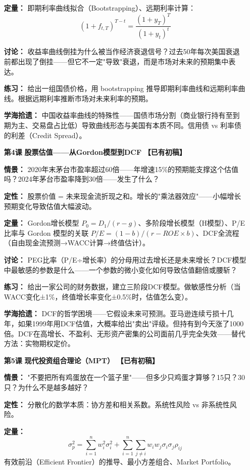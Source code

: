 \documentclass[a4paper,11pt]{ctexart}
\newcommand{\done}{\textcolor{green!50!black}{\textbf{【已有初稿】}}}
\begin{document}
\begin{enumerate}
\textbf{定量：} 即期利率曲线拟合（Bootstrapping）、远期利率计算：
\[
(1+f_{t,T})^{T-t} = \frac{(1+y_T)^T}{(1+y_t)^t}
\]

\textbf{讨论：} 收益率曲线倒挂为什么被当作经济衰退信号？过去50年每次美国衰退前都出现了倒挂——但它不一定"导致"衰退，而是市场对未来的预期集中表达。

\textbf{练习：} 给出一组国债价格，用 bootstrapping 推导即期利率曲线和远期利率曲线。根据远期利率推断市场对未来利率的预期。

\textbf{学海拾遗：} 中国收益率曲线的特殊性——国债市场分割（商业银行持有至到期为主、交易盘占比低）导致曲线形态与美国有本质不同。信用债 vs 利率债的利差（Credit Spread）。

\item[\textbf{第4课}] \textbf{股票估值——从Gordon模型到DCF} \done

\textbf{情景：} 2020年末茅台市盈率超过60倍——年增速15\%的预期能支撑这个估值吗？2024年茅台市盈率降到30倍——发生了什么？

\textbf{定性：} 股票价值 = 未来现金流折现之和。增长的"乘法器效应"——小幅增长预期变化导致估值大幅波动。

\textbf{定量：} Gordon增长模型 $P_0 = D_1/(r-g)$、多阶段增长模型（H模型）、P/E比率与 Gordon 模型的关联 $P/E = (1-b)/(r-ROE \times b)$、DCF全流程（自由现金流预测→WACC计算→终值估计）。

\textbf{讨论：} PEG比率（P/E÷增长率）的分母用过去增长还是未来增长？DCF模型中最敏感的参数是什么——一个参数的微小变化如何导致估值翻倍或腰斩？

\textbf{练习：} 给出一家公司的财务数据，建立三阶段DCF模型。做敏感性分析（当WACC变化±1\%，终值增长率变化±0.5\%时，估值怎么变）。

\textbf{学海拾遗：} DCF的哲学困境——它假设未来可预测。亚马逊连续亏损十几年，如果1999年用DCF估值，大概率给出"卖出"评级。但持有到今天涨了1000倍。DCF在高增长、不盈利、无形资产密集的公司面前几乎完全失效——替代方法：实物期权定价。

\item[\textbf{第5课}] \textbf{现代投资组合理论（MPT）} \done

\textbf{情景：} "不要把所有鸡蛋放在一个篮子里"——但多少只鸡蛋才算够？15只？30只？为什么不是越多越好？

\textbf{定性：} 分散化的数学本质：协方差和相关系数。系统性风险 vs 非系统性风险。

\textbf{定量：} 
\[
\sigma_p^2 = \sum_{i=1}^{n} w_i^2 \sigma_i^2 + \sum_{i=1}^{n} \sum_{j \neq i} w_i w_j \sigma_i \sigma_j \rho_{ij}
\]
有效前沿（Efficient Frontier）的推导、最小方差组合、Market Portfolio。


\end{enumerate}
\end{document}
